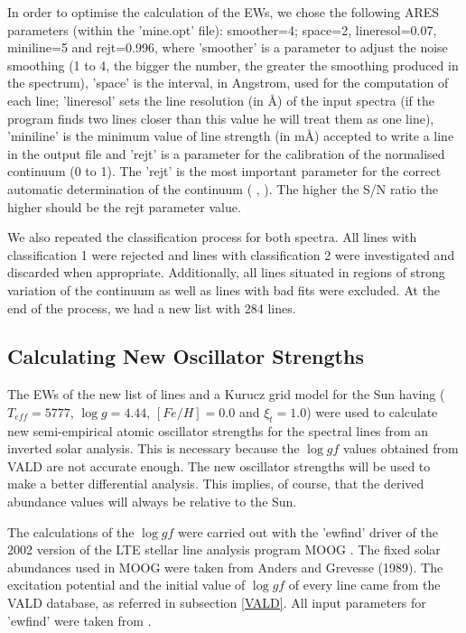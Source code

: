 \documentclass[dvips,12pt,a4paper]{report}
\begin{document}
{In order to optimise the calculation of the EWs, we chose the following ARES parameters (within the 'mine.opt' file): smoother=4; space=2, lineresol=0.07, miniline=5 and rejt=0.996, where 'smoother' is a parameter to adjust the noise smoothing (1 to 4, the bigger the number, the greater the smoothing produced in the spectrum), 'space' is the interval, in Angstrom, used for the computation of each line; 'lineresol' sets the line resolution (in \AA) of the input spectra (if the program finds two lines closer than this value he will treat them as one line),  'miniline' is the minimum value of line strength (in m\AA{}) accepted to write a line in the output file and 'rejt' is a parameter for the calibration of the normalised continuum (0 to 1). The 'rejt' is the most important parameter for the correct automatic determination of the continuum (\citeauthor{Sousa-2007} \citeyear{Sousa-2007}, \citeauthor{Sousa-2008} \citeyear{Sousa-2008}). The higher the S/N ratio the higher should be the rejt parameter value.

We also repeated the classification process for both spectra. All lines with classification 1 were rejected and lines with classification 2 were investigated and discarded when appropriate. Additionally, all lines situated in regions of strong variation of the continuum as well as lines with bad fits were excluded. At the end of the process, we had a new list with 284 lines. 

\subsection {Calculating New Oscillator Strengths}
\label{newloggf}
The EWs of the new list of lines and a Kurucz grid model for the Sun \citep{Kurucz-1993} having ($T_{eff}=5777$, $\log g=4.44$, $[Fe/H]=0.0$ and $\xi_t=1.0$) were used to calculate new semi-empirical atomic oscillator strengths for the spectral lines from an inverted solar analysis. This is necessary because the $\log gf$ values obtained from VALD are not accurate enough. The new oscillator strengths will be used to make a better differential analysis. This implies, of course, that the derived abundance values will always be relative to the Sun.

The calculations of the $\log gf$ were carried out with the 'ewfind' driver of the 2002 version of the LTE stellar line analysis program MOOG \citep{Sneden-1973}. The fixed solar abundances used in MOOG were taken from Anders and Grevesse (1989). The excitation potential and the initial value of $\log gf$ of every line came from the VALD database, as referred in subsection \ref{VALD}. All input parameters for 'ewfind' were taken from \citet{Santos-2004b}. 


}
\end{document}
